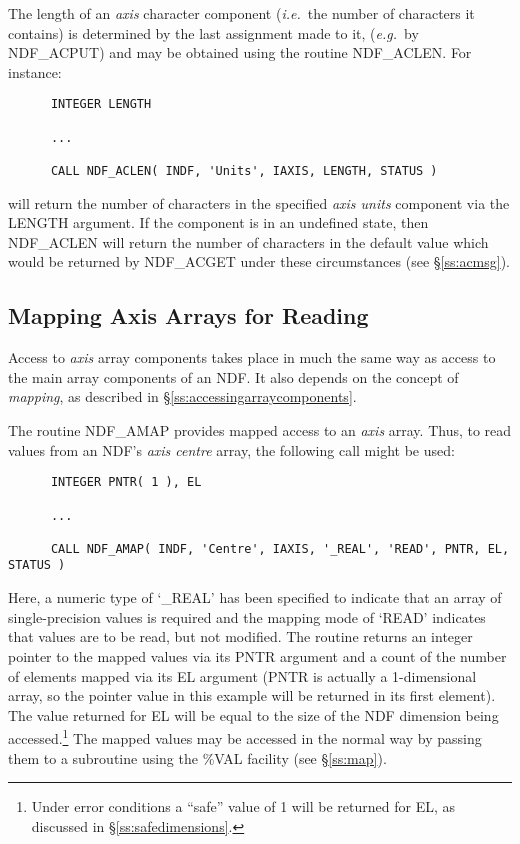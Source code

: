 \documentclass[twoside,11pt]{article}
\newcommand{\htmlref}[2]{#1}
\newcommand{\xlabel}[1]{}
\newcommand{\st}[1]{{\em{#1}}}
\begin{document}
The length of an \st{axis\/} character component (\st{i.e.}\ the number of
characters it contains) is determined by the last assignment made to it,
(\st{e.g.}\ by NDF\_ACPUT) and may be obtained using the routine
\htmlref{NDF\_ACLEN}{NDF_ACLEN}. 
For instance:

\small
\begin{verbatim}
      INTEGER LENGTH

      ...

      CALL NDF_ACLEN( INDF, 'Units', IAXIS, LENGTH, STATUS )
\end{verbatim}
\normalsize

will return the number of characters in the specified \st{axis units\/}
component via the LENGTH argument.
If the component is in an undefined state, then NDF\_ACLEN will return
the number of characters in the default value which would be returned
by NDF\_ACGET under these circumstances (see \S\ref{ss:acmsg}).

\subsection{\xlabel{mapping_axis_arrays_for_reading}Mapping Axis Arrays for Reading}

Access to \st{axis\/} array components takes place in much the same way as
access to the main array components of an NDF.
It also depends on the concept of \st{mapping}, as described in
\S\ref{ss:accessingarraycomponents}. 

The routine \htmlref{NDF\_AMAP}{NDF_AMAP} provides mapped access to an \st{axis\/} array.
Thus, to read values from an NDF's \st{axis centre\/} array, the following 
call might be used:

\small
\begin{verbatim}
      INTEGER PNTR( 1 ), EL

      ...

      CALL NDF_AMAP( INDF, 'Centre', IAXIS, '_REAL', 'READ', PNTR, EL, STATUS )
\end{verbatim}
\normalsize

Here, a numeric type of `\_REAL' has been specified to indicate that an
array of single-precision values is required and the mapping mode of `READ'
indicates that values are to be read, but not modified. 
The routine returns an integer pointer to the mapped values via its PNTR
argument and a count of the number of elements mapped via its EL argument
(PNTR is actually a 1-dimensional array, so the pointer value in this
example will be returned in its first element). 
The value returned for EL will be equal to the size of the NDF dimension
being accessed.\footnote{Under error conditions a ``safe'' value of 1 will
be returned for EL, as discussed in \S\ref{ss:safedimensions}.} 
The mapped values may be accessed in the normal way by passing them to a
subroutine using the \%VAL facility (see \S\ref{ss:map}). 
\end{document}
